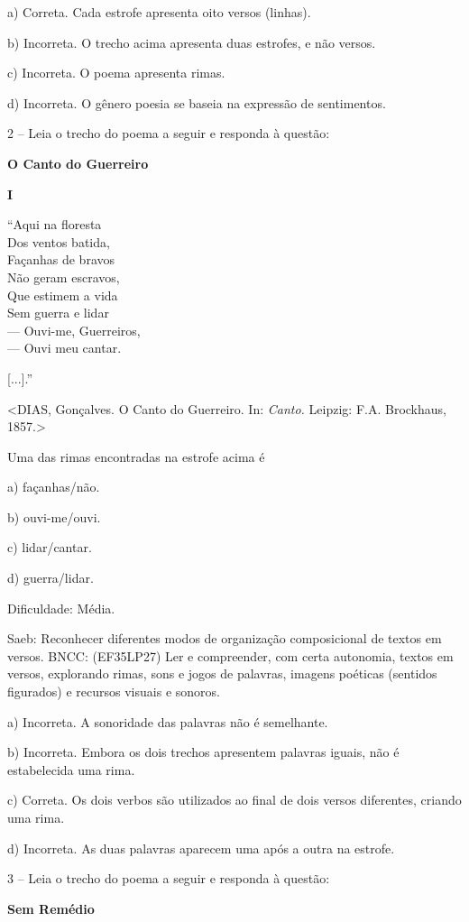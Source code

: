a) Correta. Cada estrofe apresenta oito versos (linhas).

b) Incorreta. O trecho acima apresenta duas estrofes, e não versos.

c) Incorreta. O poema apresenta rimas.

d) Incorreta. O gênero poesia se baseia na expressão de sentimentos.

2 -- Leia o trecho do poema a seguir e responda à questão:

\textbf{O Canto do Guerreiro}

\textbf{I}

``Aqui na floresta\\
Dos ventos batida,\\
Façanhas de bravos\\
Não geram escravos,\\
Que estimem a vida\\
Sem guerra e lidar\\
--- Ouvi-me, Guerreiros,\\
--- Ouvi meu cantar.

{[}...{]}.''

\textless{}DIAS, Gonçalves. O Canto do Guerreiro. In: \emph{Canto.}
Leipzig: F.A. Brockhaus, 1857.\textgreater{}

Uma das rimas encontradas na estrofe acima é

a) façanhas/não.

b) ouvi-me/ouvi.

c) lidar/cantar.

d) guerra/lidar.

Dificuldade: Média.

Saeb: Reconhecer diferentes modos de organização composicional de textos
em versos. BNCC: (EF35LP27) Ler e compreender, com certa autonomia,
textos em versos, explorando rimas, sons e jogos de palavras, imagens
poéticas (sentidos figurados) e recursos visuais e sonoros.

a) Incorreta. A sonoridade das palavras não é semelhante.

b) Incorreta. Embora os dois trechos apresentem palavras iguais, não é
estabelecida uma rima.

c) Correta. Os dois verbos são utilizados ao final de dois versos
diferentes, criando uma rima.

d) Incorreta. As duas palavras aparecem uma após a outra na estrofe.

3 -- Leia o trecho do poema a seguir e responda à questão:

\textbf{Sem Remédio}

